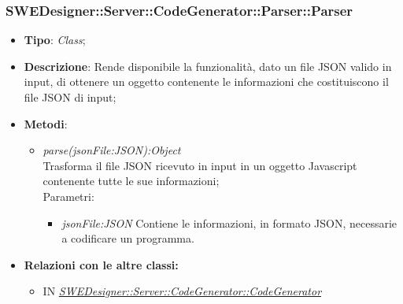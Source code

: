 \documentclass[../DefinizioneDiProdotto.tex]{subfiles}
\begin{document}
			\subsubsection{SWEDesigner::Server::CodeGenerator::Parser::Parser}
			\hypertarget{SWEDesigner::Server::CodeGenerator::Parser::Parser}{}
			\begin{itemize}
				\item \textbf{Tipo}: \emph{Class};
				\item \textbf{Descrizione}: Rende disponibile la funzionalità, dato un file JSON valido in input, di ottenere un oggetto contenente le informazioni che costituiscono il file JSON di input;\\
				\item \textbf{Metodi}:
				\begin{itemize}
					\item \emph{parse(jsonFile:JSON):Object} \\ 
					Trasforma il file JSON ricevuto in input in un oggetto Javascript contenente tutte le sue informazioni; \\
					Parametri:
					\begin{itemize}
						\item \emph{jsonFile:JSON} Contiene le informazioni, in formato JSON, necessarie a codificare un programma.
					\end{itemize}
				\end{itemize}
				
				\item \textbf{Relazioni con le altre classi:}
				\begin{itemize}
					\item IN \hyperlink{SWEDesigner::Server::CodeGenerator::CodeGenerator}{\emph{SWEDesigner::Server::CodeGenerator::CodeGenerator}}
				\end{itemize}	
			\end{itemize}
			
			
			
\end{document}
